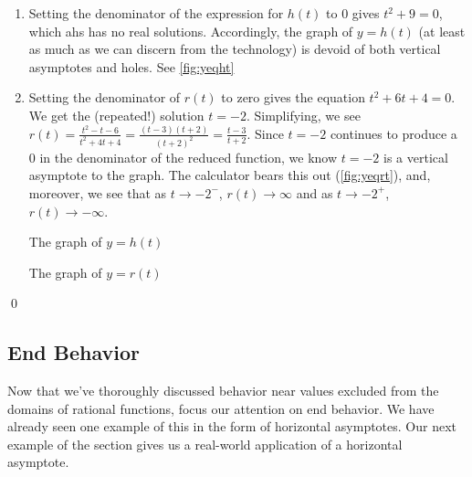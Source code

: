 \begin{ex}
\begin{ex}
\begin{enumerate}
\begin{mfigure}
  

\caption{The graph of $y=g(t)$}
\label{fig:yeqfxeqtsquaredetc}
\end{mfigure}

\item  Setting the denominator of the expression for $h(t)$ to $0$ gives $t^2+9 = 0$, which ahs has no real solutions.  Accordingly, the graph of $y=h(t)$ (at least as much as we can discern from the technology) is devoid of both vertical asymptotes and holes. See \autoref{fig:yeqht}

\item  Setting the denominator of $r(t)$ to zero gives the equation $t^2+6t+4 = 0$.  We get  the (repeated!) solution $t=-2$.  Simplifying, we see  $r(t) = \frac{t^2-t-6}{t^2+4t+4} = \frac{(t-3)(t+2)}{(t+2)^2} = \frac{t-3}{t+2}$.  Since $t=-2$ continues to produce a $0$ in the denominator of the reduced function, we know $t=-2$ is a vertical asymptote to the graph.  The calculator bears this out (\autoref{fig:yeqrt}), and, moreover, we see that as $t \rightarrow -2^{-}$, $r(t) \rightarrow \infty$ and as $t \rightarrow -2^{+}$, $r(t) \rightarrow -\infty$.


\begin{mfigure}


\caption{The graph of $y=h(t)$}
\label{fig:yeqht}
\end{mfigure}

\begin{mfigure}
  

\caption{The graph of $y=r(t)$}
\label{fig:yeqrt}
\end{mfigure}

\end{enumerate}
\qed
\end{ex}

\subsection{End Behavior}
\label{ebrationalsection}

Now that we've thoroughly discussed behavior near values excluded from the domains of rational functions, focus our attention on  end behavior.  We have already seen one example of this in the form of horizontal asymptotes.  Our next example of the section gives us a real-world application of a horizontal asymptote.


\end{ex}
